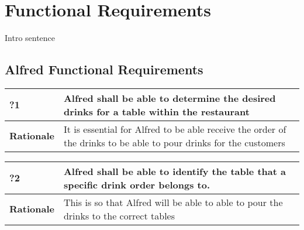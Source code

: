 \documentclass [11pt]{article}
\begin{document}


\section {Functional Requirements} 
Intro sentence






\subsection{Alfred Functional Requirements}

\begin{longtable}{| p{ } | p{ } | }\hline 
\rowcolor{tableCell}\textbf{?1} & Alfred shall be able to determine the desired drinks for a table within the restaurant \\ \hline
\textbf{Rationale} & It is essential for Alfred to be able receive the order of the drinks to be able to pour drinks for the customers\\ \hline 
\end{longtable}

\begin{longtable}{| p{ } | p{ } | }\hline 
\rowcolor{tableCell}\textbf{?2} & Alfred shall be able to identify the table that a specific drink order belongs to.\\ \hline
\textbf{Rationale} &  This is so that Alfred will be able to able to pour the drinks to the correct tables\\ \hline 

\end{longtable}
\end{document}
